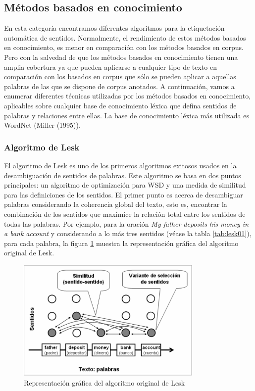 \subsection{Métodos basados en conocimiento}
En esta categoría encontramos diferentes algoritmos para la etiquetación automática de sentidos. Normalmente, el rendimiento de estos métodos basados en conocimiento, es menor en comparación con los métodos basados en corpus. Pero con la salvedad de que los métodos basados en conocimiento tienen una amplia cobertura ya que pueden aplicarse a cualquier tipo de texto en comparación con los basados en corpus que sólo se pueden aplicar a aquellas palabras de las que se dispone de corpus anotados. A continuación, vamos a enumerar diferentes técnicas utilizadas por los métodos basados en conocimiento, aplicables sobre cualquier base de conocimiento léxica que defina sentidos de palabras y relaciones entre ellas. La base de conocimiento léxica más utilizada es WordNet (Miller (1995)). 



\subsubsection{Algoritmo de Lesk}
El algoritmo de Lesk \cite{002} es uno de los primeros algoritmos exitosos usados en la desambiguación de sentidos de palabras. Este algoritmo se basa en dos puntos principales: un algoritmo de optimización para WSD y una medida de similitud para las definiciones de los sentidos.
El primer punto es acerca de desambiguar palabras considerando la coherencia global del texto, esto es, encontrar la combinación de los sentidos que maximice la relación total entre los sentidos de todas las palabras.
Por ejemplo, para la oración \textit{My father deposits his money in a bank account} y considerando a lo más tres sentidos (véase la tabla \ref{tab:lesk01}), para cada palabra, la figura \ref{fig:algoritmo_lesk} muestra la representación gráfica del algoritmo original de Lesk.

  \begin{figure}[h!]
    \begin{center}
    \includegraphics[angle=0, width=9cm]{Graficos/algoritmo_lesk}
    \caption{Representación gráfica del algoritmo original de Lesk \cite{001}}
    \label{fig:algoritmo_lesk}
    \end{center}
  \end{figure}

